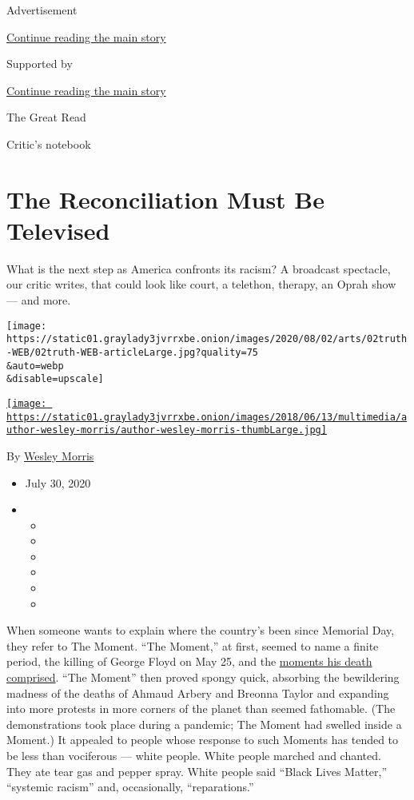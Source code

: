 Advertisement

\protect\hyperlink{after-top}{Continue reading the main story}

Supported by

\protect\hyperlink{after-sponsor}{Continue reading the main story}

The Great Read

Critic's notebook

\hypertarget{the-reconciliation-must-be-televised}{%
\section{The Reconciliation Must Be
Televised}\label{the-reconciliation-must-be-televised}}

What is the next step as America confronts its racism? A broadcast
spectacle, our critic writes, that could look like court, a telethon,
therapy, an Oprah show --- and more.

\texttt{[image: https://static01.graylady3jvrrxbe.onion/images/2020/08/02/arts/02truth-WEB/02truth-WEB-articleLarge.jpg?quality=75\\\&auto=webp\\\&disable=upscale]}

\href{https://www.nytimes3xbfgragh.onion/by/wesley-morris}{\texttt{[image: https://static01.graylady3jvrrxbe.onion/images/2018/06/13/multimedia/author-wesley-morris/author-wesley-morris-thumbLarge.jpg]}}

By \href{https://www.nytimes3xbfgragh.onion/by/wesley-morris}{Wesley
Morris}

\begin{itemize}
\item
  July 30, 2020
\item
  \begin{itemize}
  \item
  \item
  \item
  \item
  \item
  \item
  \end{itemize}
\end{itemize}

When someone wants to explain where the country's been since Memorial
Day, they refer to The Moment. ``The Moment,'' at first, seemed to name
a finite period, the killing of George Floyd on May 25, and the
\href{https://www.nytimes3xbfgragh.onion/2020/06/03/arts/george-floyd-video-racism.html}{moments
his death comprised}. ``The Moment'' then proved spongy quick, absorbing
the bewildering madness of the deaths of Ahmaud Arbery and Breonna
Taylor and expanding into more protests in more corners of the planet
than seemed fathomable. (The demonstrations took place during a
pandemic; The Moment had swelled inside a Moment.) It appealed to people
whose response to such Moments has tended to be less than vociferous ---
white people. White people marched and chanted. They ate tear gas and
pepper spray. White people said ``Black Lives Matter,'' ``systemic
racism'' and, occasionally, ``reparations.''

